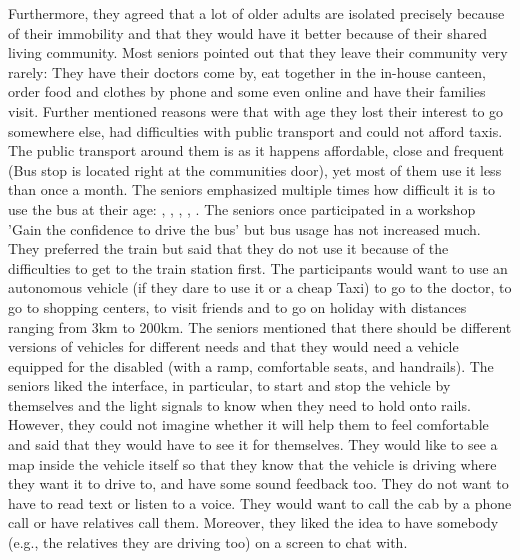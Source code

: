 Furthermore, they agreed that a lot of older adults are isolated precisely because of their immobility and that they would have it better because of their shared living community. Most seniors pointed out that they leave their community very rarely: They have their doctors come by, eat together in the in-house canteen,  order food and clothes by phone and some even online and have their families visit. Further mentioned reasons were that with age they lost their interest to go somewhere else, had difficulties with public transport and could not afford taxis. The public transport around them is as it happens affordable, close and frequent (Bus stop is located right at the communities door), yet most of them use it less than once a month. The seniors emphasized multiple times how difficult it is to use the bus at their age: , , , , . The seniors once participated in a workshop 'Gain the confidence to drive the bus' but bus usage has not increased much. They preferred the train but said that they do not use it because of the difficulties to get to the train station first. 
The participants would want to use an autonomous vehicle (if they dare to use it or a cheap Taxi) to go to the doctor, to go to shopping centers, to visit friends and to go on holiday with distances ranging from 3km to 200km.  
The seniors mentioned that there should be different versions of vehicles for different needs and that they would need a vehicle equipped for the disabled (with a ramp, comfortable seats, and handrails). The seniors liked the interface, in particular, to start and stop the vehicle by themselves and the light signals to know when they need to hold onto rails. However, they could not imagine whether it will help them to feel comfortable and said that they would have to see it for themselves. They would like to see a map inside the vehicle itself so that they know that the vehicle is driving where they want it to drive to, and have some sound feedback too. They do not want to have to read text or listen to a voice. They would want to call the cab by a phone call or have relatives call them. Moreover, they liked the idea to have somebody (e.g., the relatives they are driving too) on a screen to chat with. 


